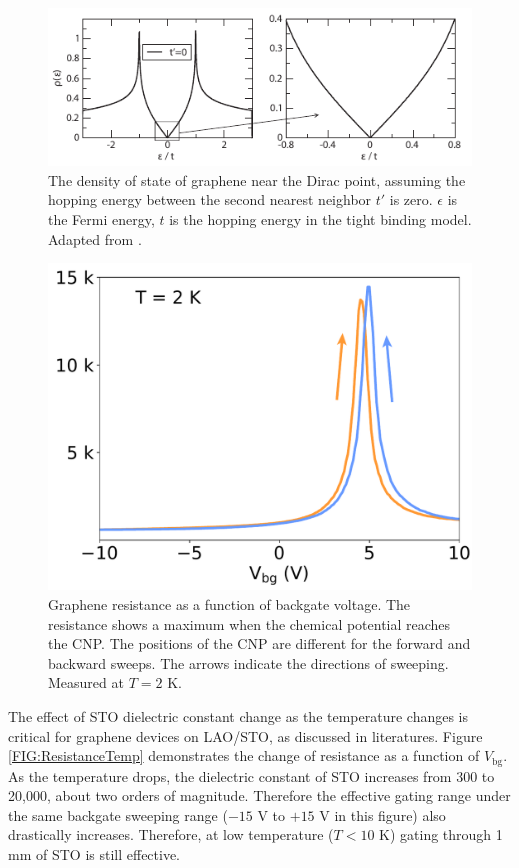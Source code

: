 \documentclass[pdflatex, sectionletters, 12pt]{pittetd}    %
\begin{document}
\begin{figure}[h!]
	\centering
	\includegraphics[width=.9\textwidth]{Drawing/DOS.pdf}
	\caption{The density of state of graphene near the Dirac point, assuming the hopping energy between the second nearest neighbor $t'$ is zero. $\epsilon$ is the Fermi energy, $t$ is the hopping energy in the tight binding model. Adapted from \cite{neto2009electronic}.}
	\label{FIG:DOS}
\end{figure}

\begin{figure}[h!]
	\centering
	\includegraphics[width=.5\textwidth]{Drawing/DiracPeak.pdf}
	\caption{Graphene resistance as a function of backgate voltage. The resistance shows a maximum when the chemical potential reaches the CNP. The positions of the CNP are different for the forward and backward sweeps. The arrows indicate the directions of sweeping. Measured at $T = 2$ K.}
	\label{FIG:DiracPeak}
\end{figure}

The effect of STO dielectric constant change as the temperature changes is critical for graphene devices on LAO/STO, as discussed in literatures\cite{couto2011transport}. Figure \ref{FIG:ResistanceTemp} demonstrates the change of resistance as a function of $V_\mathrm{bg}$. As the temperature drops, the dielectric constant of STO increases from 300 to 20,000, about two orders of magnitude. Therefore the effective gating range under the same backgate sweeping range ($-15$ V to $+15$ V in this figure) also drastically increases. Therefore, at low temperature ($T < 10$ K) gating through 1 mm of STO is still effective.
\end{document}
